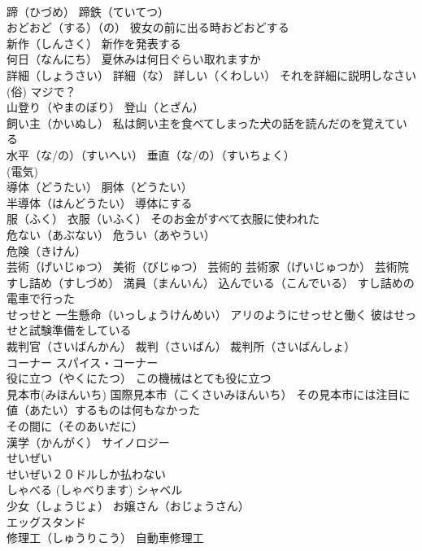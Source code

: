 \documentclass[8pt]{extreport}
\begin{document}
\begin{CJK}{UTF8}{min}
\\	蹄（ひづめ） 蹄鉄（ていてつ）
\\	おどおど（する）（の） 彼女の前に出る時おどおどする
\\	新作（しんさく） 新作を発表する
\\	何日（なんにち） 夏休みは何日ぐらい取れますか
\\	詳細（しょうさい） 詳細（な） 詳しい（くわしい） それを詳細に説明しなさい
\\	(俗)	マジで？
\\	山登り（やまのぼり） 登山（とざん）
\\	飼い主（かいぬし） 私は飼い主を食べてしまった犬の話を読んだのを覚えている
\\	水平（な/の）（すいへい） 垂直（な/の）（すいちょく）
\\	(電気) 
\\	導体（どうたい） 胴体（どうたい）
\\	半導体（はんどうたい） 導体にする
\\	服（ふく） 衣服（いふく） そのお金がすべて衣服に使われた
\\	危ない（あぶない） 危うい（あやうい）
\\	危険（きけん）
\\	芸術（げいじゅつ） 美術（びじゅつ） 芸術的 芸術家（げいじゅつか） 芸術院
\\	すし詰め（すしづめ） 満員（まんいん） 込んでいる（こんでいる） すし詰めの電車で行った
\\	せっせと 一生懸命（いっしょうけんめい） アリのようにせっせと働く 彼はせっせと試験準備をしている
\\	裁判官（さいばんかん） 裁判（さいばん） 裁判所（さいばんしょ）
\\	コーナー スパイス・コーナー
\\	役に立つ（やくにたつ） この機械はとても役に立つ
\\	見本市(みほんいち) 国際見本市（こくさいみほんいち） その見本市には注目に値（あたい）するものは何もなかった
\\	その間に（そのあいだに）
\\	漢学（かんがく） サイノロジー
\\	せいぜい 
\\	せいぜい２０ドルしか払わない
\\	しゃべる (しゃべります) シャベル　
\\	少女（しょうじょ） お嬢さん（おじょうさん）
\\	エッグスタンド
\\	修理工（しゅうりこう） 自動車修理工

\end{CJK}
\end{document}
